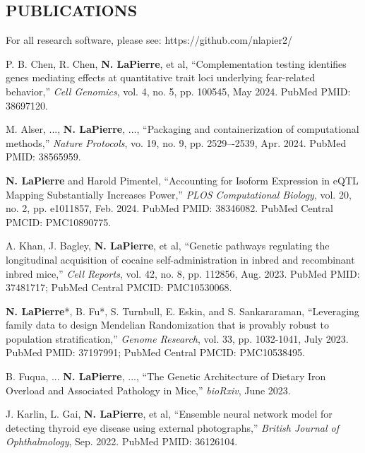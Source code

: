 \documentclass[margin, 10pt]{res} %
\begin{document}
\begin{resume}
\section{PUBLICATIONS}

 



For all research software, please see: https://github.com/nlapier2/

P. B. Chen, R. Chen, \textbf{N. LaPierre}, et al, ``Complementation testing identifies genes mediating effects at quantitative trait loci underlying fear-related behavior,'' \emph{Cell Genomics}, vol. 4, no. 5, pp. 100545, May 2024. PubMed PMID: 38697120.

M. Alser, ..., \textbf{N. LaPierre}, ..., ``Packaging and containerization of computational methods,'' \emph{Nature Protocols}, vo. 19, no. 9, pp. 2529–-2539, Apr. 2024. PubMed PMID: 38565959.

\textbf{N. LaPierre} and Harold Pimentel, ``Accounting for Isoform Expression in eQTL Mapping Substantially Increases Power,'' \emph{PLOS Computational Biology}, vol. 20, no. 2, pp. e1011857, Feb. 2024. PubMed PMID: 38346082. PubMed Central PMCID: PMC10890775.

A. Khan, J. Bagley, \textbf{N. LaPierre}, et al, ``Genetic pathways regulating the longitudinal acquisition of cocaine self-administration in inbred and recombinant inbred mice,'' \emph{Cell Reports}, vol. 42, no. 8, pp. 112856, Aug. 2023.  PubMed PMID: 37481717; PubMed Central PMCID: PMC10530068.  

\textbf{N. LaPierre}*, B. Fu*, S. Turnbull, E. Eskin, and S. Sankararaman, ``Leveraging family data to design Mendelian Randomization that is provably robust to population stratification,'' \emph{Genome Research}, vol. 33, pp. 1032-1041, July 2023.  PubMed PMID: 37197991; PubMed Central PMCID: PMC10538495.

B. Fuqua, ... \textbf{N. LaPierre}, ..., ``The Genetic Architecture of Dietary Iron Overload and Associated Pathology in Mice,'' \emph{bioRxiv}, June 2023.

J. Karlin, L. Gai, \textbf{N. LaPierre}, et al, ``Ensemble neural network model for detecting thyroid eye disease using external photographs,'' \emph{British Journal of Ophthalmology}, Sep. 2022.  PubMed PMID: 36126104.


\end{resume}
\end{document}
